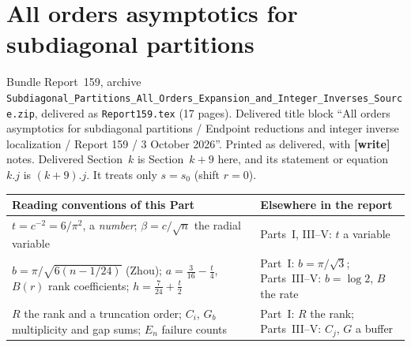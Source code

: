 \documentclass[11pt,letterpaper]{article}
\numberwithin{equation}{section}
\theoremstyle{remark}\newtheorem{remark}[theorem]{Remark}
\newcommand{\file}[1]{\nolinkurl{#1}}
\newcommand{\partsource}[1]{\par\noindent\begin{minipage}{\textwidth}\small #1\end{minipage}\par\medskip}
\begin{document}
\part{All orders asymptotics for subdiagonal partitions}\label{dgp:sub:part}
\partsource{Bundle Report~159, archive \file{Subdiagonal_Partitions_All_Orders_Expansion_and_Integer_Inverses_Source.zip}, delivered as \file{Report159.tex} (17 pages). Delivered title block ``All orders asymptotics for subdiagonal partitions / Endpoint reductions and integer inverse localization / Report 159 / 3 October 2026''. Printed as delivered, with \textbf{[write]} notes. Delivered Section~$k$ is Section~$k+9$ here, and its statement or equation $k.j$ is $(k+9).j$. It treats only $s=s_0$ (shift $r=0$).}
\begin{center}
\small
\begin{tabular}{@{}>{\raggedright\arraybackslash}p{} >{\raggedright\arraybackslash}p{}@{}}
\toprule
Reading conventions of this Part & Elsewhere in the report\\
\midrule
$t=c^{-2}=6/\pi^2$, a \emph{number}; $\beta=c/\sqrt n$ the radial variable & Parts~I, III--V: $t$ a variable\\
$b=\pi/\sqrt{6(n-1/24)}$ (Zhou); $a=\frac3{16}-\frac t4$, $B(r)$ rank coefficients; $h=\frac7{24}+\frac t2$ & Part~I: $b=\pi/\sqrt3$; Parts~III--V: $b=\log2$, $B$ the rate\\
$R$ the rank and a truncation order; $C_i$, $G_b$ multiplicity and gap sums; $E_n$ failure counts & Part~I: $R$ the rank; Parts~III--V: $C_j$, $G$ a buffer\\
\bottomrule
\end{tabular}
\end{center}
\end{document}
